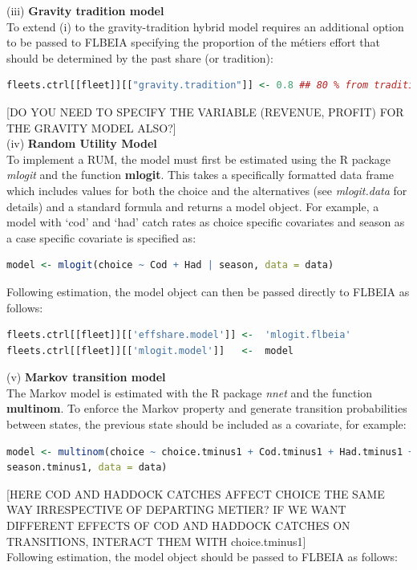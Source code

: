 \documentclass[12pt, halfline, a4paper]{ouparticle}
\begin{document}
(iii) \textbf{Gravity tradition model} \\

To extend (i) to the gravity-tradition hybrid model requires an additional
option to be passed to FLBEIA specifying the proportion of the métiers effort
that should be determined by the past share (or tradition):

\begin{lstlisting}[language=R]
fleets.ctrl[[fleet]][["gravity.tradition"]] <- 0.8 ## 80 % from tradition
\end{lstlisting}
[DO YOU NEED TO SPECIFY THE VARIABLE (REVENUE, PROFIT) FOR THE GRAVITY MODEL ALSO?]\\

(iv) \textbf{Random Utility Model} \\

To implement a RUM, the model must first be estimated using the R package
\textit{mlogit} \citep{Croissant2019} and the function \textbf{mlogit}. This
takes a specifically formatted data frame which includes values for both the
choice and the alternatives (see \textit{mlogit.data} for details) and a
standard formula and returns a model object. For example, a model with `cod'
and `had' catch rates as choice specific covariates and season as a case
specific covariate is specified as:

\begin{lstlisting}[language=R]
model <- mlogit(choice ~ Cod + Had | season, data = data)
\end{lstlisting}


Following estimation, the model object can then be passed directly to FLBEIA as follows:

\begin{lstlisting}[language=R]
fleets.ctrl[[fleet]][['effshare.model']] <-  'mlogit.flbeia'
fleets.ctrl[[fleet]][['mlogit.model']]   <-  model 
\end{lstlisting}

(v) \textbf{Markov transition model} \\

The Markov model is estimated with the R package \textit{nnet} and the
function \textbf{multinom}. To enforce the Markov property and
generate transition probabilities between states, the previous state should be
included as a covariate, for example:

\begin{lstlisting}[language=R]
model <- multinom(choice ~ choice.tminus1 + Cod.tminus1 + Had.tminus1 +
season.tminus1, data = data)
\end{lstlisting}
[HERE COD AND HADDOCK CATCHES AFFECT CHOICE THE SAME WAY IRRESPECTIVE OF DEPARTING METIER? IF WE WANT DIFFERENT EFFECTS OF COD AND HADDOCK CATCHES ON TRANSITIONS, INTERACT THEM WITH choice.tminus1]\\
Following estimation, the model object should be passed to FLBEIA as follows:
\end{document}
